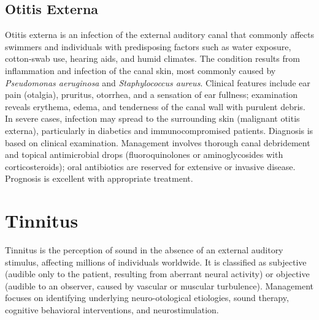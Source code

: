 \subsection{Otitis Externa}
\label{sec:Otitis Externa}
Otitis externa is an infection of the external auditory canal that commonly affects swimmers and individuals with predisposing factors such as water exposure, cotton-swab use, hearing aids, and humid climates. The condition results from inflammation and infection of the canal skin, most commonly caused by \textit{Pseudomonas aeruginosa} and \textit{Staphylococcus aureus}. Clinical features include ear pain (otalgia), pruritus, otorrhea, and a sensation of ear fullness; examination reveals erythema, edema, and tenderness of the canal wall with purulent debris. In severe cases, infection may spread to the surrounding skin (malignant otitis externa), particularly in diabetics and immunocompromised patients. Diagnosis is based on clinical examination. Management involves thorough canal debridement and topical antimicrobial drops (fluoroquinolones or aminoglycosides with corticosteroids); oral antibiotics are reserved for extensive or invasive disease. Prognosis is excellent with appropriate treatment.

\section{Tinnitus}








\label{sec:section:Tinnitus}
Tinnitus is the perception of sound in the absence of an external auditory stimulus, affecting millions of individuals worldwide. It is classified as subjective (audible only to the patient, resulting from aberrant neural activity) or objective (audible to an observer, caused by vascular or muscular turbulence). Management focuses on identifying underlying neuro-otological etiologies, sound therapy, cognitive behavioral interventions, and neurostimulation.

